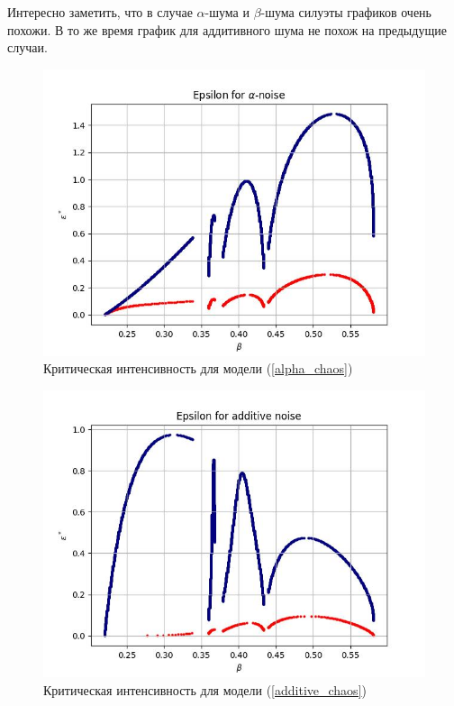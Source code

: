     Интересно заметить, что в случае \(\alpha\)-шума и \(\beta\)-шума силуэты графиков очень похожи. В то же время график для аддитивного шума не похож на предыдущие случаи.

    \begin{figure}
        \centering
        \includegraphics[width=\textwidth]{stochastic/images/critical_intensity_alpha_noise.jpg}
        
        \captionsetup{justification=centering}
        \caption{Критическая интенсивность для модели (\ref{alpha_chaos})}
        \label{critical_intensity_alpha_noise}
    \end{figure}

    \begin{figure}
        \centering
        \includegraphics[width=\textwidth]{stochastic/images/critical_intensity_additive_noise.jpg}
        
        \captionsetup{justification=centering}
        \caption{Критическая интенсивность для модели (\ref{additive_chaos})}
        \label{critical_intensity_additive_noise}
    \end{figure}
